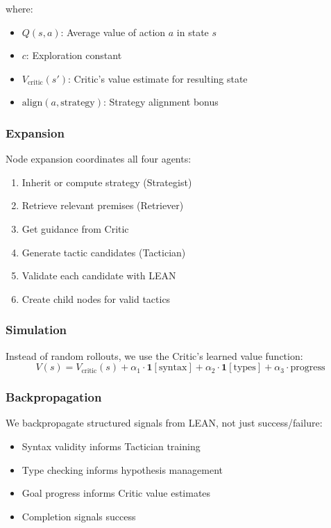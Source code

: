\documentclass[11pt]{article}
\begin{document}
where:
\begin{itemize}
    \item $Q(s,a)$: Average value of action $a$ in state $s$
    \item $c$: Exploration constant
    \item $V_{\text{critic}}(s')$: Critic's value estimate for resulting state
    \item $\text{align}(a, \text{strategy})$: Strategy alignment bonus
\end{itemize}

\subsubsection{Expansion}

Node expansion coordinates all four agents:
\begin{enumerate}
    \item Inherit or compute strategy (Strategist)
    \item Retrieve relevant premises (Retriever)
    \item Get guidance from Critic
    \item Generate tactic candidates (Tactician)
    \item Validate each candidate with LEAN
    \item Create child nodes for valid tactics
\end{enumerate}

\subsubsection{Simulation}

Instead of random rollouts, we use the Critic's learned value function:
\begin{equation}
    V(s) = V_{\text{critic}}(s) + \alpha_1 \cdot \mathbf{1}[\text{syntax}] + \alpha_2 \cdot \mathbf{1}[\text{types}] + \alpha_3 \cdot \text{progress}
\end{equation}

\subsubsection{Backpropagation}

We backpropagate structured signals from LEAN, not just success/failure:
\begin{itemize}
    \item Syntax validity informs Tactician training
    \item Type checking informs hypothesis management
    \item Goal progress informs Critic value estimates
    \item Completion signals success
\end{itemize}
\end{document}
